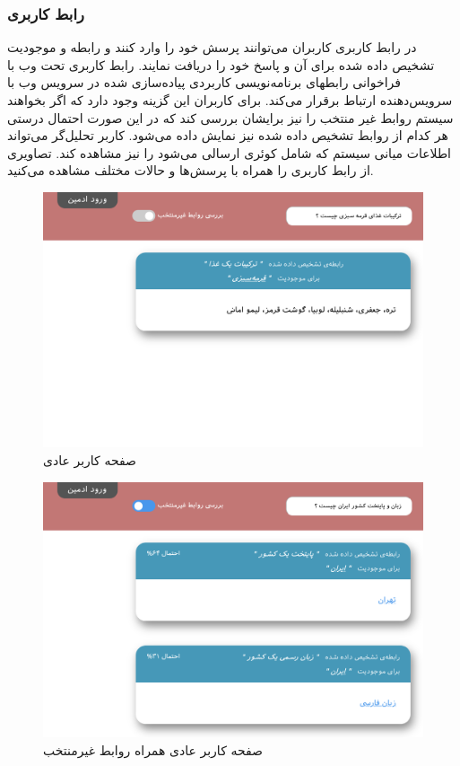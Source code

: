 \subsubsection{رابط کاربری}
در رابط کاربری کاربران می‌توانند پرسش خود را وارد کنند و رابطه و موجودیت تشخیص داده شده برای آن و پاسخ خود را دریافت نمایند. رابط کاربری تحت وب با فراخوانی رابطهای برنامه‌نویسی کاربردی پیاده‌سازی شده در سرویس وب با سرویس‌دهنده ارتباط برقرار می‌کند. برای کاربران این گزینه وجود دارد که اگر بخواهند سیستم روابط غیر منتخب را نیز برایشان بررسی کند که در این صورت احتمال درستی هر کدام از روابط تشخیص‌ داده شده نیز نمایش داده می‌شود. کاربر تحلیل‌گر می‌تواند اطلاعات میانی سیستم که شامل کوئری ارسالی می‌شود را نیز مشاهده کند. تصاویری از رابط کاربری را همراه با پرسش‌ها و حالات مختلف مشاهده می‌کنید.
\vfill
\begin{figure}[h]
	\centering
	\includegraphics[width=15cm]{figures/interface/user.png}
	\caption{صفحه کاربر عادی}
\end{figure}
\vfill
\begin{figure}
	\centering
	\includegraphics[width=15cm]{figures/interface/user-multiple-rel.png}
	\caption{صفحه کاربر عادی همراه روابط غیرمنتخب}
\end{figure}

